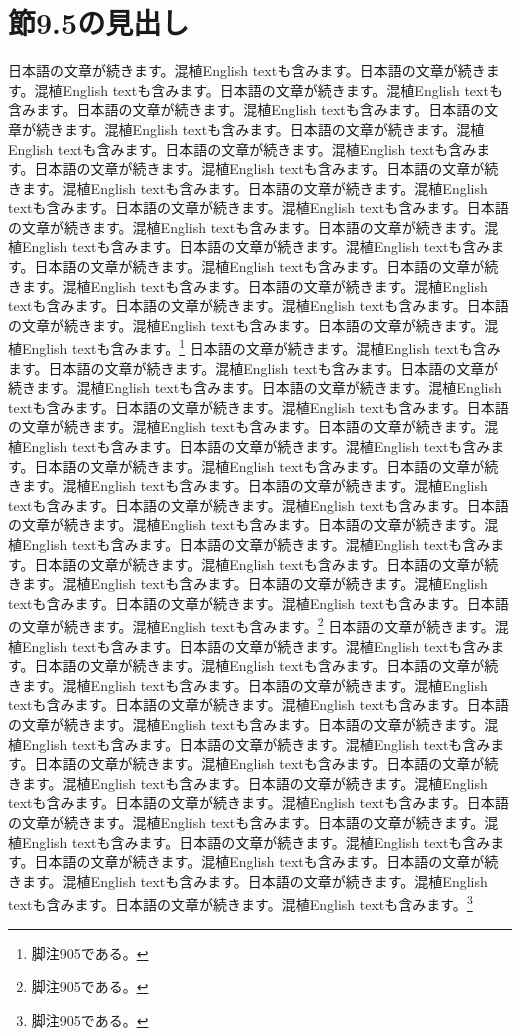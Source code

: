 \documentclass[pdflatex,book]{jlreq}
\begin{document}
\section{節9.5の見出し}
日本語の文章が続きます。混植English textも含みます。日本語の文章が続きます。混植English textも含みます。日本語の文章が続きます。混植English textも含みます。日本語の文章が続きます。混植English textも含みます。日本語の文章が続きます。混植English textも含みます。日本語の文章が続きます。混植English textも含みます。日本語の文章が続きます。混植English textも含みます。日本語の文章が続きます。混植English textも含みます。日本語の文章が続きます。混植English textも含みます。日本語の文章が続きます。混植English textも含みます。日本語の文章が続きます。混植English textも含みます。日本語の文章が続きます。混植English textも含みます。日本語の文章が続きます。混植English textも含みます。日本語の文章が続きます。混植English textも含みます。日本語の文章が続きます。混植English textも含みます。日本語の文章が続きます。混植English textも含みます。日本語の文章が続きます。混植English textも含みます。日本語の文章が続きます。混植English textも含みます。日本語の文章が続きます。混植English textも含みます。日本語の文章が続きます。混植English textも含みます。\footnote{脚注905である。}
日本語の文章が続きます。混植English textも含みます。日本語の文章が続きます。混植English textも含みます。日本語の文章が続きます。混植English textも含みます。日本語の文章が続きます。混植English textも含みます。日本語の文章が続きます。混植English textも含みます。日本語の文章が続きます。混植English textも含みます。日本語の文章が続きます。混植English textも含みます。日本語の文章が続きます。混植English textも含みます。日本語の文章が続きます。混植English textも含みます。日本語の文章が続きます。混植English textも含みます。日本語の文章が続きます。混植English textも含みます。日本語の文章が続きます。混植English textも含みます。日本語の文章が続きます。混植English textも含みます。日本語の文章が続きます。混植English textも含みます。日本語の文章が続きます。混植English textも含みます。日本語の文章が続きます。混植English textも含みます。日本語の文章が続きます。混植English textも含みます。日本語の文章が続きます。混植English textも含みます。日本語の文章が続きます。混植English textも含みます。日本語の文章が続きます。混植English textも含みます。\footnote{脚注905である。}
日本語の文章が続きます。混植English textも含みます。日本語の文章が続きます。混植English textも含みます。日本語の文章が続きます。混植English textも含みます。日本語の文章が続きます。混植English textも含みます。日本語の文章が続きます。混植English textも含みます。日本語の文章が続きます。混植English textも含みます。日本語の文章が続きます。混植English textも含みます。日本語の文章が続きます。混植English textも含みます。日本語の文章が続きます。混植English textも含みます。日本語の文章が続きます。混植English textも含みます。日本語の文章が続きます。混植English textも含みます。日本語の文章が続きます。混植English textも含みます。日本語の文章が続きます。混植English textも含みます。日本語の文章が続きます。混植English textも含みます。日本語の文章が続きます。混植English textも含みます。日本語の文章が続きます。混植English textも含みます。日本語の文章が続きます。混植English textも含みます。日本語の文章が続きます。混植English textも含みます。日本語の文章が続きます。混植English textも含みます。日本語の文章が続きます。混植English textも含みます。\footnote{脚注905である。}
\end{document}
